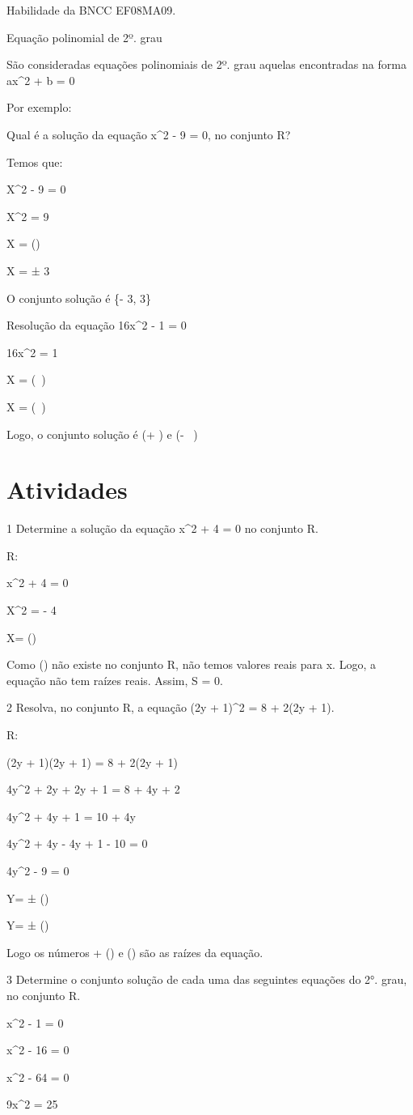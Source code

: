 {Habilidade da BNCC EF08MA09.

Equação polinomial de 2º. grau

São consideradas equações polinomiais de 2º. grau aquelas encontradas na
forma ax^2 + b = 0

Por exemplo:

Qual é a solução da equação x^2 - 9 = 0, no conjunto R?

Temos que:

X^2 - 9 = 0

X^2 = 9

X = ()

X = ± 3

O conjunto solução é \{- 3, 3\}

Resolução da equação 16x^2 - 1 = 0

16x^2 = 1

X = (\  \pm {})

X = (\  \pm {})

Logo, o conjunto solução é (+ ) e (- \ )

\section{Atividades}

\num{1} Determine a solução da equação x^2 + 4 = 0 no conjunto R.

R:

x^2 + 4 = 0

X^2 = - 4

X= ()

Como () não existe no conjunto R, não temos valores reais
para x. Logo, a equação não tem raízes reais. Assim, S = 0.

\num{2} Resolva, no conjunto R, a equação (2y + 1)^2 = 8 + 2(2y + 1).

R:

(2y + 1)(2y + 1) = 8 + 2(2y + 1)

4y^2 + 2y + 2y + 1 = 8 + 4y + 2

4y^2 + 4y + 1 = 10 + 4y

4y^2 + 4y - 4y + 1 - 10 = 0

4y^2 - 9 = 0

Y= ± ()

Y= ± ()

Logo os números + () e () são as raízes da
equação.

\num{3} Determine o conjunto solução de cada uma das seguintes equações do
2°. grau, no conjunto R.
\item x^2 - 1 = 0
\item x^2 - 16 = 0
\item x^2 - 64 = 0
\item 9x^2 = 25

}
